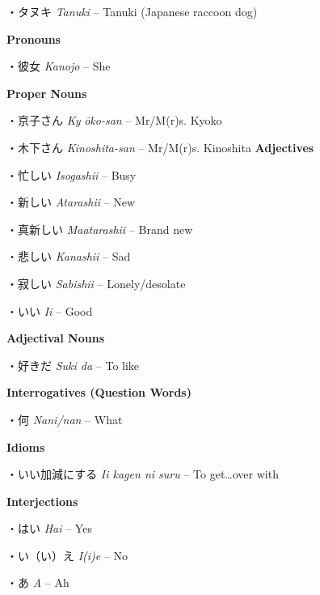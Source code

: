 \par{・タヌキ \emph{Tanuki }– Tanuki (Japanese raccoon dog) }

\par{\textbf{Pronouns }}

\par{・彼女 \emph{Kanojo }– She }

\par{\textbf{Proper Nouns }}

\par{・京子さん \emph{Ky }\emph{ōko-san }– Mr\slash M(r)s. Kyoko }

\par{・木下さん \emph{Kinoshita-san }– Mr\slash M(r)s. Kinoshita }
\textbf{Adjectives }
\par{・忙しい \emph{Isogashii }– Busy }

\par{・新しい \emph{Atarashii }– New }

\par{・真新しい \emph{Ma\textquotesingle atarashii }– Brand new }

\par{・悲しい \emph{Kanashii }– Sad }

\par{・寂しい \emph{Sabishii }– Lonely\slash desolate }

\par{・いい \emph{Ii }– Good }

\par{\textbf{Adjectival Nouns }}

\par{・好きだ \emph{Suki da }– To like }

\par{\textbf{Interrogatives (Question Words) }}

\par{・何 \emph{Nani\slash nan }– What }
 
\par{\textbf{Idioms }}

\par{・いい加減にする \emph{Ii kagen ni suru }– To get…over with }

\par{\textbf{Interjections }}

\par{・はい \emph{Hai }– Yes }

\par{・い（い）え \emph{I(i)e }– No }

\par{・あ \emph{A }– Ah }

